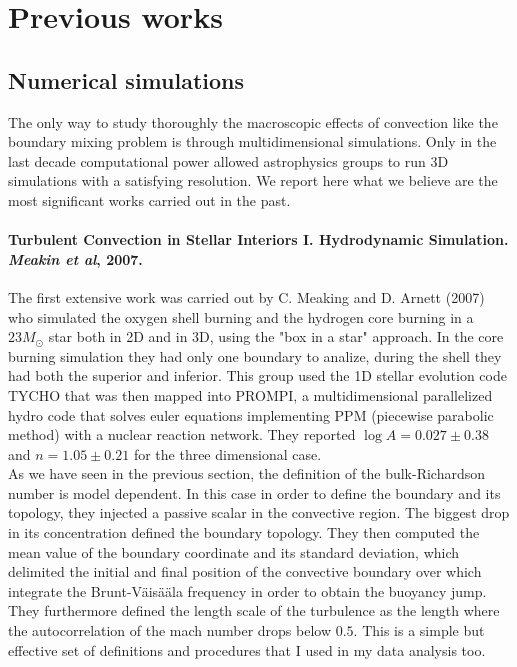 
\section{Previous works}

\subsection{Numerical simulations}

The only way to study thoroughly the macroscopic effects of convection like the boundary mixing problem is through multidimensional simulations. Only in the last decade computational power allowed astrophysics groups to run 3D simulations with a satisfying resolution. We report here what we believe are the most significant works carried out in the past. 

\paragraph{Turbulent Convection in Stellar Interiors I. Hydrodynamic Simulation. \textit{Meakin et al}, 2007.} 
The first extensive work was carried out by C. Meaking and D. Arnett (2007) who simulated the oxygen shell burning and the hydrogen core burning in a $23 M_{\odot}$ star both in 2D and in 3D, using the "box in a star" approach. In the core burning simulation they had only one boundary to analize, during the shell they had both the superior and inferior. This group used the 1D stellar evolution code TYCHO that was then mapped into PROMPI, a multidimensional parallelized hydro code that solves euler equations implementing PPM (piecewise parabolic method) with a nuclear reaction network. They reported $\log A=0.027 \pm 0.38$ and $n=1.05 \pm 0.21$ for the three dimensional case. \\
As we have seen in the previous section, the definition of the bulk-Richardson number is model dependent. In this case in order to define the boundary and its topology, they injected a passive scalar in the convective region. The biggest drop in its concentration defined the boundary topology. They then computed the mean value of the boundary coordinate and its standard deviation, which delimited the initial and final position of the convective boundary over which integrate the Brunt-Väisääla frequency in order to obtain the buoyancy jump. They furthermore defined the length scale of the turbulence as the length where the autocorrelation of the mach number drops below $0.5$. This is a simple but effective set of definitions and procedures that I used in my data analysis too. \\
